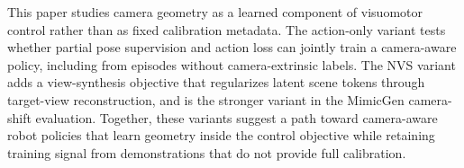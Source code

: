 This paper studies camera geometry as a learned component of visuomotor control rather than as fixed calibration metadata.  The action-only variant tests whether partial pose supervision and action loss can jointly train a camera-aware policy, including from episodes without camera-extrinsic labels.  The NVS variant adds a view-synthesis objective that regularizes latent scene tokens through target-view reconstruction, and is the stronger variant in the MimicGen camera-shift evaluation.  Together, these variants suggest a path toward camera-aware robot policies that learn geometry inside the control objective while retaining training signal from demonstrations that do not provide full calibration.
